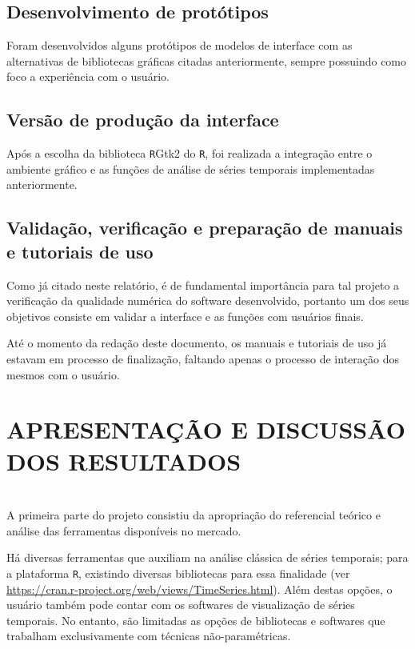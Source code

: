 \documentclass[12pt,letterpaper]{article}
\begin{document}
\subsection*{Desenvolvimento de protótipos}

Foram desenvolvidos alguns protótipos de modelos de interface com as alternativas de bibliotecas gráficas citadas anteriormente, sempre possuindo como foco a experiência com o usuário.

\subsection*{Versão de produção da interface}

Após a escolha da biblioteca \texttt RGtk2 do \texttt R, foi realizada a integração entre o ambiente gráfico e as funções de análise de séries temporais implementadas anteriormente.

\subsection*{Validação, verificação e preparação de manuais e tutoriais de uso}

Como já citado neste relatório, é de fundamental importância para tal projeto a verificação da qualidade numérica do software desenvolvido, portanto um dos seus objetivos consiste em validar a interface e as funções com usuários finais.

Até o momento da redação deste documento, os manuais e tutoriais de uso já estavam em processo de finalização, faltando apenas o processo de interação dos mesmos com o usuário.



\newpage
\section*{\centering \textbf{APRESENTAÇÃO E DISCUSSÃO DOS RESULTADOS}}
\hrulefill \\

A primeira parte do projeto consistiu da apropriação do referencial teórico e análise das ferramentas disponíveis no mercado.

Há diversas ferramentas que auxiliam na análise clássica de séries temporais; para a plataforma \texttt R, existindo diversas bibliotecas para essa finalidade (ver \url{https://cran.r-project.org/web/views/TimeSeries.html}). Além destas opções, o usuário também pode contar com os softwares de visualização de séries temporais. No entanto, são limitadas as opções de bibliotecas e softwares que trabalham exclusivamente com técnicas não-paramétricas.
\end{document}
